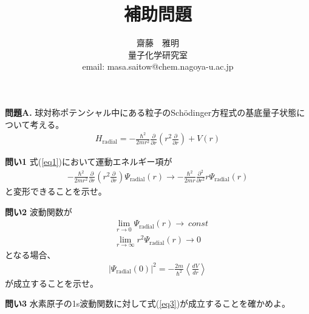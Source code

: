 \documentclass[11pt,pra,aps]{revtex4}
\begin{document}
\title{補助問題}
\author{齋藤　雅明 \\ 量子化学研究室 \\ email: masa.saitow@chem.nagoya-u.ac.jp}

\maketitle

\noindent
{\bf 問題A.} 球対称ポテンシャル中にある粒子のSch\"odinger方程式の基底量子状態について考える。
\begin{align}
  H_\text{radial}=-\frac{\hbar^2}{2mr^2}\frac{\partial}{\partial r}\left(r^2 \frac{\partial}{\partial r}\right) + V(r) \label{eq1}
\end{align}

\noindent
{\bf 問い1} 式(\ref{eq1})において運動エネルギー項が
\begin{align}
  -\frac{\hbar^2}{2mr^2}\frac{\partial}{\partial r}\left(r^2 \frac{\partial}{\partial r}\right)\Psi_\text{radial}(r) \rightarrow
  -\frac{\hbar^2}{2mr}\frac{\partial^2}{\partial r^2} r\Psi_\text{radial}(r)
\end{align}
と変形できることを示せ。

\noindent
{\bf 問い2} 波動関数が
\begin{align}
  &\lim_{r\rightarrow 0}\Psi_\text{radial}(r)\rightarrow \ const \\
  &\lim_{r\rightarrow\infty}r^2\Psi_\text{radial}(r)\rightarrow 0
\end{align}   
となる場合、
\begin{align}
  |\Psi_\text{radial}(0)|^2=-\frac{2m}{\hbar^2}\left\langle\frac{d V}{dr}\right\rangle \label{eq3}
\end{align}   
が成立することを示せ。

\noindent
{\bf 問い3} 水素原子の1s波動関数に対して式(\ref{eq3})が成立することを確かめよ。
\end{document}
